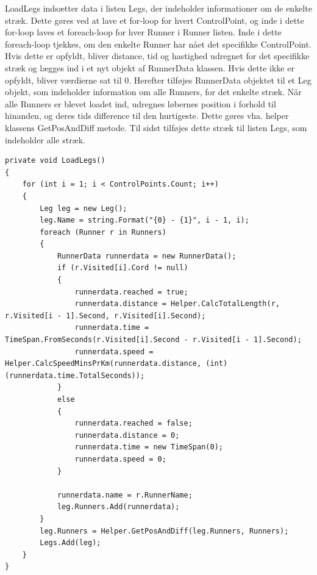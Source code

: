 LoadLegs indsætter data i listen Legs, der indeholder informationer om de enkelte stræk. Dette gøres ved at lave et for-loop for hvert ControlPoint, og inde i dette for-loop laves et foreach-loop for hver Runner i Runner listen. Inde i dette foreach-loop tjekkes, om den enkelte Runner har nået det specifikke ControlPoint. Hvis dette er opfyldt, bliver distance, tid og hastighed udregnet for det specifikke stræk og lægges ind i et nyt objekt af RunnerData klassen. Hvis dette ikke er opfyldt, bliver værdierne sat til 0. Herefter tilføjes RunnerData objektet til et Leg objekt, som indeholder information om alle Runners, for det enkelte stræk. Når alle Runners er blevet loadet ind, udregnes løbernes position i forhold til hinanden, og deres tids difference til den hurtigeste. Dette gøres vha. helper klassens GetPosAndDiff metode. Til sidst tilføjes dette stræk til listen Legs, som indeholder alle stræk. 

\begin{lstlisting}
private void LoadLegs()
{
    for (int i = 1; i < ControlPoints.Count; i++)
    {
        Leg leg = new Leg();
        leg.Name = string.Format("{0} - {1}", i - 1, i);
        foreach (Runner r in Runners)
        {
            RunnerData runnerdata = new RunnerData();
            if (r.Visited[i].Cord != null)
            {
                runnerdata.reached = true;
                runnerdata.distance = Helper.CalcTotalLength(r, r.Visited[i - 1].Second, r.Visited[i].Second);
                runnerdata.time = TimeSpan.FromSeconds(r.Visited[i].Second - r.Visited[i - 1].Second);
                runnerdata.speed = Helper.CalcSpeedMinsPrKm(runnerdata.distance, (int)(runnerdata.time.TotalSeconds));
            }
            else
            {
                runnerdata.reached = false;
                runnerdata.distance = 0;
                runnerdata.time = new TimeSpan(0);
                runnerdata.speed = 0;
            }

            runnerdata.name = r.RunnerName;
            leg.Runners.Add(runnerdata);
        }
        leg.Runners = Helper.GetPosAndDiff(leg.Runners, Runners);
        Legs.Add(leg);
    }
}
\end{lstlisting}






